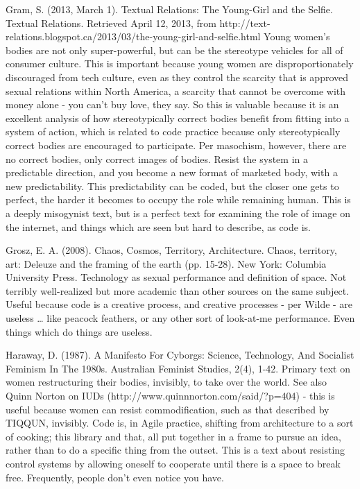 Gram, S. (2013, March 1). Textual Relations: The Young-Girl and the Selfie. Textual Relations. Retrieved 
	April 12, 2013, from http://text-relations.blogspot.ca/2013/03/the-young-girl-and-selfie.html
	Young women's bodies are not only super-powerful, but can be the stereotype vehicles for all of consumer culture. This is important because young women are disproportionately discouraged from tech culture, even as they control the scarcity that is approved sexual relations within North America, a scarcity that cannot be overcome with money alone - you can't buy love, they say. So this is valuable because it is an excellent analysis of how stereotypically correct bodies benefit from fitting into a system of action, which is related to code practice because only stereotypically correct bodies are encouraged to participate. Per masochism, however, there are no correct bodies, only correct images of bodies. Resist the system in a predictable direction, and you become a new format of marketed body, with a new predictability. This predictability can be coded, but the closer one gets to perfect, the harder it becomes to occupy the role while remaining human. This is a deeply misogynist text, but is a perfect text for examining the role of image on the internet, and things which are seen but hard to describe, as code is.
	

Grosz, E. A. (2008). Chaos, Cosmos, Territory, Architecture. Chaos, territory, art: Deleuze and the framing 
	of the earth (pp. 15-28). New York: Columbia University Press.
	Technology as sexual performance and definition of space. Not terribly well-realized but more academic than other sources on the same subject. Useful because code is a creative process, and creative processes - per Wilde - are useless … like peacock feathers, or any other sort of look-at-me performance. Even things which do things are useless.

Haraway, D. (1987). A Manifesto For Cyborgs: Science, Technology, And Socialist Feminism In The 1980s. 		Australian Feminist Studies, 2(4), 1-42.
	Primary text on women restructuring their bodies, invisibly, to take over the world. See also Quinn Norton on IUDs (http://www.quinnnorton.com/said/?p=404) - this is useful because women can resist commodification, such as that described by TIQQUN, invisibly. Code is, in Agile practice, shifting from architecture to a sort of cooking; this library and that, all put together in a frame to pursue an idea, rather than to do a specific thing from the outset. This is a text about resisting control systems by allowing oneself to cooperate until there is a space to break free. Frequently, people don't even notice you have.

